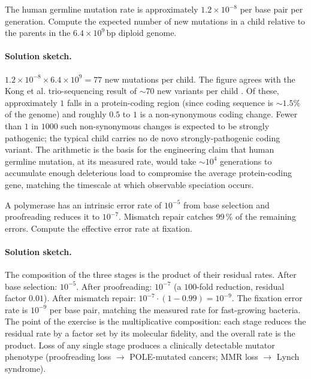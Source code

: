 \begin{exercise}
The human germline mutation rate is approximately
$1.2 \times 10^{-8}$ per base pair per generation. Compute the
expected number of new mutations in a child relative to the parents
in the $6.4 \times 10^9\,\text{bp}$ diploid genome.
\end{exercise}

\paragraph{Solution sketch.} $1.2 \times 10^{-8} \times 6.4 \times
10^9 = 77$ new mutations per child. The figure agrees with the Kong
et al. trio-sequencing result of $\sim 70$ new variants per child
\cite{paper:v6c03-kong-2012}. Of these, approximately $1$ falls in a
protein-coding region (since coding sequence is $\sim 1.5\%$ of the
genome) and roughly $0.5$ to $1$ is a non-synonymous coding change.
Fewer than $1$ in $1000$ such non-synonymous changes is expected to
be strongly pathogenic; the typical child carries no de novo
strongly-pathogenic coding variant. The arithmetic is the basis for
the engineering claim that human germline mutation, at its measured
rate, would take $\sim 10^4$ generations to accumulate enough
deleterious load to compromise the average protein-coding gene,
matching the timescale at which observable speciation occurs.

\begin{exercise}
A polymerase has an intrinsic error rate of $10^{-5}$ from base
selection and proofreading reduces it to $10^{-7}$. Mismatch repair
catches $99\,\%$ of the remaining errors. Compute the effective
error rate at fixation.
\end{exercise}

\paragraph{Solution sketch.} The composition of the three stages is
the product of their residual rates. After base selection: $10^{-5}$.
After proofreading: $10^{-7}$ (a $100$-fold reduction, residual factor
$0.01$). After mismatch repair: $10^{-7} \cdot (1 - 0.99) = 10^{-9}$.
The fixation error rate is $10^{-9}$ per base pair, matching the
measured rate for fast-growing bacteria. The point of the exercise is
the multiplicative composition: each stage reduces the residual rate
by a factor set by its molecular fidelity, and the overall rate is
the product. Loss of any single stage produces a clinically detectable
mutator phenotype (proofreading loss $\to$ POLE-mutated cancers;
MMR loss $\to$ Lynch syndrome).

